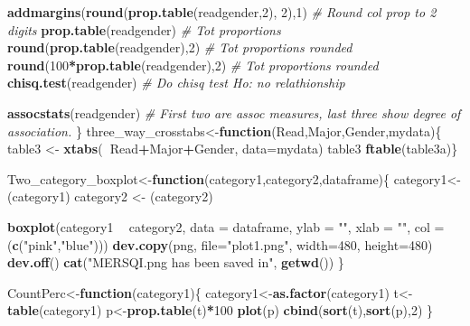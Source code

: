 \documentclass[]{article}
\newenvironment{Shaded}{\begin{snugshade}}{\end{snugshade}}
\newcommand{\CommentTok}[1]{\textcolor[rgb]{0.56,0.35,0.01}{\textit{#1}}}
\newcommand{\ControlFlowTok}[1]{\textcolor[rgb]{0.13,0.29,0.53}{\textbf{#1}}}
\newcommand{\DataTypeTok}[1]{\textcolor[rgb]{0.13,0.29,0.53}{#1}}
\newcommand{\DecValTok}[1]{\textcolor[rgb]{0.00,0.00,0.81}{#1}}
\newcommand{\KeywordTok}[1]{\textcolor[rgb]{0.13,0.29,0.53}{\textbf{#1}}}
\newcommand{\NormalTok}[1]{#1}
\newcommand{\OperatorTok}[1]{\textcolor[rgb]{0.81,0.36,0.00}{\textbf{#1}}}
\newcommand{\StringTok}[1]{\textcolor[rgb]{0.31,0.60,0.02}{#1}}
\begin{document}
\begin{Shaded}
\begin{Highlighting}[]
\KeywordTok{addmargins}\NormalTok{(}\KeywordTok{round}\NormalTok{(}\KeywordTok{prop.table}\NormalTok{(readgender,}\DecValTok{2}\NormalTok{), }\DecValTok{2}\NormalTok{),}\DecValTok{1}\NormalTok{) }\CommentTok{# Round col prop to 2 digits}
\KeywordTok{prop.table}\NormalTok{(readgender) }\CommentTok{# Tot proportions}
\KeywordTok{round}\NormalTok{(}\KeywordTok{prop.table}\NormalTok{(readgender),}\DecValTok{2}\NormalTok{) }\CommentTok{# Tot proportions rounded}
\KeywordTok{round}\NormalTok{(}\DecValTok{100}\OperatorTok{*}\KeywordTok{prop.table}\NormalTok{(readgender),}\DecValTok{2}\NormalTok{) }\CommentTok{# Tot proportions rounded}
\KeywordTok{chisq.test}\NormalTok{(readgender) }\CommentTok{# Do chisq test Ho: no relathionship}


\KeywordTok{assocstats}\NormalTok{(readgender) }\CommentTok{# First two are assoc measures, last three show degree of association.}
\NormalTok{\}}
\NormalTok{three_way_crosstabs<-}\ControlFlowTok{function}\NormalTok{(Read,Major,Gender,mydata)\{}
\NormalTok{table3 <-}\StringTok{ }\KeywordTok{xtabs}\NormalTok{(}\OperatorTok{~}\NormalTok{Read}\OperatorTok{+}\NormalTok{Major}\OperatorTok{+}\NormalTok{Gender, }\DataTypeTok{data=}\NormalTok{mydata)}
\NormalTok{table3}
\KeywordTok{ftable}\NormalTok{(table3a)\}}

\NormalTok{Two_category_boxplot<-}\ControlFlowTok{function}\NormalTok{(category1,category2,dataframe)\{}
\NormalTok{  category1<-}\StringTok{ }\NormalTok{(category1)}
\NormalTok{  category2 <-}\StringTok{ }\NormalTok{(category2)}

\KeywordTok{boxplot}\NormalTok{(category1 }\OperatorTok{~}\StringTok{ }\NormalTok{category2, }
        \DataTypeTok{data =}\NormalTok{ dataframe, }
        \DataTypeTok{ylab =} \StringTok{""}\NormalTok{, }
        \DataTypeTok{xlab =} \StringTok{""}\NormalTok{,}
        \DataTypeTok{col =}\NormalTok{ (}\KeywordTok{c}\NormalTok{(}\StringTok{"pink"}\NormalTok{,}\StringTok{"blue"}\NormalTok{)))}
\KeywordTok{dev.copy}\NormalTok{(png, }\DataTypeTok{file=}\StringTok{"plot1.png"}\NormalTok{, }\DataTypeTok{width=}\DecValTok{480}\NormalTok{, }\DataTypeTok{height=}\DecValTok{480}\NormalTok{)}
        \KeywordTok{dev.off}\NormalTok{()}
        \KeywordTok{cat}\NormalTok{(}\StringTok{"MERSQI.png has been saved in"}\NormalTok{, }\KeywordTok{getwd}\NormalTok{())}
\NormalTok{\}}

\NormalTok{CountPerc<-}\ControlFlowTok{function}\NormalTok{(category1)\{}
\NormalTok{category1<-}\KeywordTok{as.factor}\NormalTok{(category1)}
\NormalTok{t<-}\KeywordTok{table}\NormalTok{(category1)}
\NormalTok{p<-}\KeywordTok{prop.table}\NormalTok{(t)}\OperatorTok{*}\DecValTok{100}
\KeywordTok{plot}\NormalTok{(p)}
\KeywordTok{cbind}\NormalTok{(}\KeywordTok{sort}\NormalTok{(t),}\KeywordTok{sort}\NormalTok{(p),}\DecValTok{2}\NormalTok{)}
\NormalTok{\}}
\end{Highlighting}
\end{Shaded}
\end{document}
